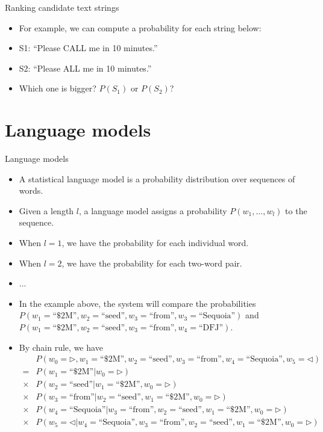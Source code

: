 \documentclass[11pt]{beamer}
\begin{document}
\begin{frame}{Ranking candidate text strings}
  \begin{itemize}
    \item For example, we can compute a probability for each string below: 
    \item S1: ``Please CALL me in 10 minutes.''
    \item S2: ``Please ALL me in 10 minutes.''
    \item Which one is bigger? $P(S_1)$ or $P(S_2)$?
  \end{itemize}
  
\end{frame}


\section{Language models }
\begin{frame}[shrink]{Language models}
\begin{itemize}[<+->]
 \item A statistical language model is a probability distribution over sequences of words. 
 \item Given a length $l$, a language model assigns a probability $P(w_1, \dots, w_l)$ to the sequence. 
 \item When $l=1$, we have the probability for each individual word. 
 \item When $l=2$, we have the probability for each two-word pair. 
 \item ...
 \item In the example above, the system will compare the probabilities $P(w_1=\text{``\$2M''}, w_2=\text{``seed''},  w_3=\text{``from''}, w_3= \text{``Sequoia''})$ and 
 $P(w_1= \text{``\$2M''}, w_2=\text{``seed''}, w_3= \text{``from''}, w_4=\text{``DFJ''})$. 
 \item By chain rule,  we have
 \begin{align*}
 & P(w_0=\rhd, w_1=\text{``\$2M''}, w_2=\text{``seed''}, w_3=\text{``from''}, w_4= \text{``Sequoia''}, w_5=\lhd) \\
 =  & 
P(w_1= \text{``\$2M''} | w_0= \rhd) \\
 \times &  P(w_2=\text{``seed''} | w_1= \text{``\$2M''}, w_0=\rhd) \\
 \times & P(w_3=\text{``from''} | w_2=\text{``seed''}, w_1= \text{``\$2M''}, w_0=\rhd) \\
 \times &  P(w_4= \text{``Sequoia''} | w_3=\text{``from''} , w_2=\text{``seed''}, w_1= \text{``\$2M''}, w_0=\rhd) \\
 \times & P(w_5= \lhd | w_4= \text{``Sequoia''}, w_3=\text{``from''} , w_2=\text{``seed''}, w_1= \text{``\$2M''}, w_0=\rhd)
 \end{align*}
 \end{itemize}
\end{frame}
\end{document}
